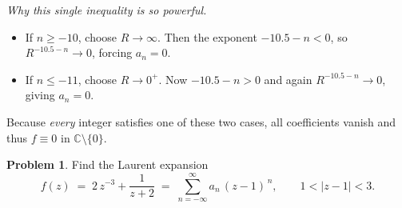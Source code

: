 \documentclass[12pt]{article}
\theoremstyle{definition} %
\newtheorem{problem}{Problem}
\theoremstyle{plain} %
\begin{document}
\medskip
\noindent
\textsl{Why this single inequality is so powerful.}
\begin{itemize}
   \item If $n\ge -10$, choose $R\to\infty$.
         Then the exponent $-10.5-n<0$, so $R^{-10.5-n}\to 0$,
         forcing $a_n=0$.
   \item If $n\le -11$, choose $R\to 0^{+}$.
         Now $-10.5-n>0$ and again $R^{-10.5-n}\to 0$,
         giving $a_n=0$.
\end{itemize}
Because \emph{every} integer satisfies one of these two cases, all
coefficients vanish and thus $f\equiv 0$ in $\mathbb{C}\setminus\{0\}$.
\pagebreak
\begin{problem}
   Find the Laurent expansion 
   \[
      f(z)\;=\;2\,z^{-3}+\frac1{z+2}
      \;=\;
      \sum_{n=-\infty}^{\infty} a_n\,(z-1)^{\,n},
      \qquad 
      1<|z-1|<3 .
   \]
   \end{problem}
\end{document}

